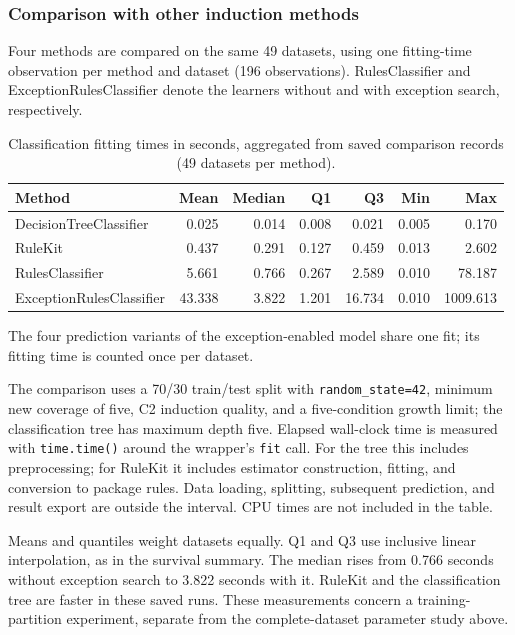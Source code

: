 \subsubsection{Comparison with other induction methods}
Four methods are compared on the same 49 datasets, using one fitting-time
observation per method and dataset (196 observations). RulesClassifier
and ExceptionRulesClassifier denote the learners without and with
exception search, respectively.

\begin{table}[htbp]
\centering
\small
\setlength{\tabcolsep}{4pt}
\caption{Classification fitting times in seconds, aggregated from saved comparison records (49 datasets per method).}
\label{tab:classification-fitting-times}
\begin{tabularx}{\linewidth}{@{}Xrrrrrr@{}}
\toprule
Method & Mean & Median & Q1 & Q3 & Min & Max \\
\midrule
DecisionTreeClassifier & 0.025 & 0.014 & 0.008 & 0.021 & 0.005 & 0.170 \\
RuleKit & 0.437 & 0.291 & 0.127 & 0.459 & 0.013 & 2.602 \\
RulesClassifier & 5.661 & 0.766 & 0.267 & 2.589 & 0.010 & 78.187 \\
ExceptionRulesClassifier & 43.338 & 3.822 & 1.201 & 16.734 & 0.010 & 1009.613 \\
\bottomrule
\end{tabularx}
\end{table}

The four prediction variants of the exception-enabled model share one fit;
its fitting time is counted once per dataset.

The comparison uses a 70/30 train/test split with \texttt{random\_state=42},
minimum new coverage of five, C2 induction quality, and a five-condition growth
limit; the classification tree has maximum depth five. Elapsed wall-clock
time is measured with \texttt{time.time()} around the wrapper's \texttt{fit} call.
For the tree this includes preprocessing; for RuleKit it includes estimator
construction, fitting, and conversion to package rules. Data loading, splitting,
subsequent prediction, and result export are outside the interval. CPU times
are not included in the table.

Means and quantiles weight datasets equally. Q1 and Q3 use inclusive linear
interpolation, as in the survival summary. The median rises from 0.766 seconds
without exception search to 3.822 seconds with it. RuleKit and the classification
tree are faster in these saved runs. These measurements concern
a training-partition experiment, separate from the complete-dataset parameter
study above.


